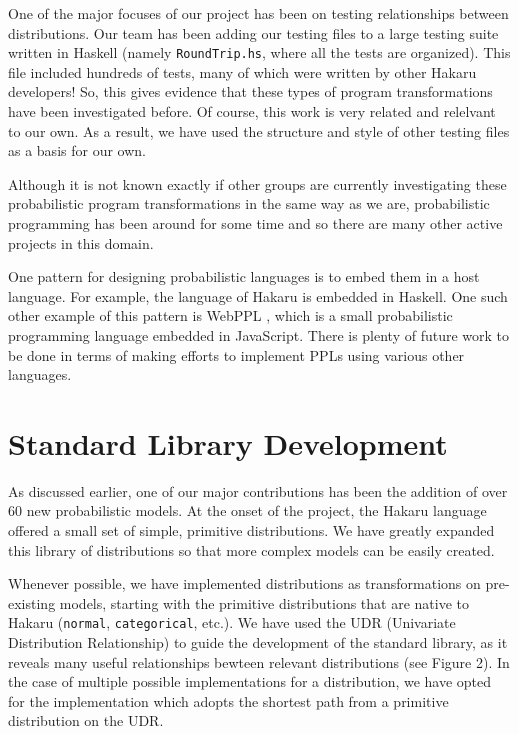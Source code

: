 \documentclass[11pt]{article}
\begin{document}
\justifying
One of the major focuses of our project has been on testing relationships between distributions. Our team has been adding our testing files to a large testing suite written in Haskell (namely {\tt RoundTrip.hs}, where all the tests are organized). This file included hundreds of tests, many of which were written by other Hakaru developers! So, this gives evidence that these types of program transformations have been investigated before. Of course, this work is very related and relelvant to our own. As a result, we have used the structure and style of other testing files as a basis for our own. 

Although it is not known exactly if other groups are currently investigating these probabilistic program transformations in the same way as we are, probabilistic programming has been around for some time and so there are many other active projects in this domain. 

One pattern for designing probabilistic languages is to embed them in a host language. For example, the language of Hakaru is embedded in Haskell. One such other example of this pattern is WebPPL \cite{dippl}, which is a small probabilistic programming language embedded in JavaScript. There is plenty of future work to be done in terms of making efforts to implement PPLs using various other languages. 


\section{Standard Library Development}

\justifying
As discussed earlier, one of our major contributions has been the addition of over 60 new probabilistic models. At the onset of the project, the Hakaru language offered a small set of simple, primitive distributions. We have greatly expanded this library of distributions so that more complex models can be easily created.

Whenever possible, we have implemented distributions as transformations on pre-existing models, starting with the primitive distributions that are native to Hakaru ({\tt normal}, {\tt categorical}, etc.). We have used the UDR (Univariate Distribution Relationship) \cite{leemis} to guide the development of the standard library, as it reveals many useful relationships bewteen relevant distributions (see Figure 2). In the case of multiple possible implementations for a distribution, we have opted for the implementation which adopts the shortest path from a primitive distribution on the UDR.
\end{document}

